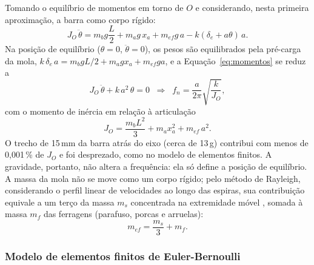 \documentclass[a4paper,10pt,twocolumn]{article}
\begin{document}
Tomando o equilíbrio de momentos em torno de $O$ e considerando, nesta primeira aproximação, a barra como corpo rígido:
\begin{equation}
    J_O\,\ddot{\theta} = m_b g \frac{L}{2} + m_a g\, x_a + m_{ef} g\, a - k(\delta_e + a\theta)\,a .
    \label{eq:momentos}
\end{equation}
Na posição de equilíbrio ($\theta = 0$, $\ddot{\theta} = 0$), os pesos são equilibrados pela pré-carga da mola, $k\,\delta_e\,a = m_b g L/2 + m_a g x_a + m_{ef} g a$, e a Equação~\ref{eq:momentos} se reduz a
\begin{equation}
    J_O\,\ddot{\theta} + k\,a^2\,\theta = 0
    \;\;\Rightarrow\;\;
    f_n = \frac{a}{2\pi}\sqrt{\frac{k}{J_O}},
    \label{eq:fn_rigida}
\end{equation}
com o momento de inércia em relação à articulação
\begin{equation}
    J_O = \frac{m_b L^2}{3} + m_a x_a^2 + m_{ef}\, a^2 .
    \label{eq:JO}
\end{equation}
O trecho de 15\,mm da barra atrás do eixo (cerca de 13\,g) contribui com menos de 0,001\,\% de $J_O$ e foi desprezado, como no modelo de elementos finitos.
A gravidade, portanto, não altera a frequência: ela só define a posição de equilíbrio. A massa da mola não se move como um corpo rígido; pelo método de Rayleigh, considerando o perfil linear de velocidades ao longo das espiras, sua contribuição equivale a um terço da massa $m_s$ concentrada na extremidade móvel \cite{Rao2010}, somada à massa $m_f$ das ferragens (parafuso, porcas e arruelas):
\begin{equation}
    m_{ef} = \frac{m_s}{3} + m_f .
    \label{eq:mef}
\end{equation}

\subsubsection{Modelo de elementos finitos de Euler-Bernoulli}
\label{sec:modelo_fe}
\end{document}

